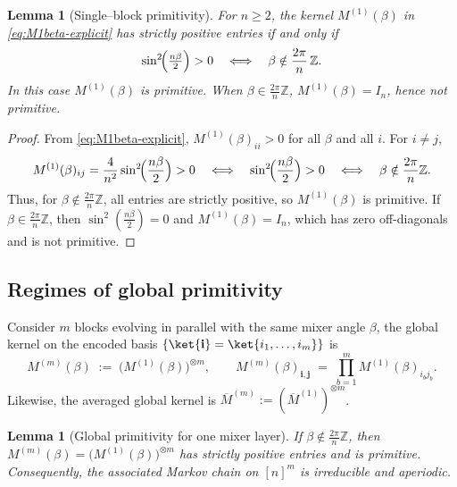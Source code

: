 \documentclass[a4paper,unpublished,onecolumn,11pt]{quantumarticle}
\newtheorem{lemma}[theorem]{Lemma}
\theoremstyle{definition}
\theoremstyle{remark}
\begin{document}
\begin{lemma}[Single--block primitivity]
\label{lem:single-block-primitivity}
For $n\ge 2$, the kernel $M^{(1)}(\beta)$ in \eqref{eq:M1beta-explicit}
has strictly positive entries if and only if
\[
  \sin^2\!\Bigl(\tfrac{n\beta}{2}\Bigr) > 0
  \quad\Longleftrightarrow\quad
  \beta \notin \frac{2\pi}{n}\,\mathbb{Z}.
\]
In this case $M^{(1)}(\beta)$ is primitive. When
$\beta \in \tfrac{2\pi}{n}\mathbb{Z}$, $M^{(1)}(\beta)=I_n$, hence not primitive.
\end{lemma}

\begin{proof}
From \eqref{eq:M1beta-explicit}, $M^{(1)}(\beta)_{ii}>0$ for all $\beta$ and all $i$.
For $i\neq j$,
\[
M^{(1)}(\beta)_{ij}=\frac{4}{n^2}\sin^2\!\Bigl(\frac{n\beta}{2}\Bigr)>0
\quad\Longleftrightarrow\quad
\sin^2\!\Bigl(\frac{n\beta}{2}\Bigr)>0
\quad\Longleftrightarrow\quad
\beta\notin\frac{2\pi}{n}\mathbb Z.
\]
Thus, for $\beta\notin\frac{2\pi}{n}\mathbb Z$, all entries are strictly positive, so
$M^{(1)}(\beta)$ is primitive. If $\beta\in\frac{2\pi}{n}\mathbb Z$, then
$\sin^2(\tfrac{n\beta}{2})=0$ and $M^{(1)}(\beta)=I_n$,
which has zero off-diagonals and is not primitive.
\end{proof}

\subsection{Regimes of global primitivity}
\label{sec:pf-primitivity}

Consider $m$ blocks evolving in parallel with the same mixer angle $\beta$, the global kernel
on the encoded basis $\{\ket{\mathbf{i}}=\ket{i_1,\dots,i_m}\}$ is
\begin{equation}
\label{eq:Mm-def}
  M^{(m)}(\beta)
  \;:=\;
  \bigl(M^{(1)}(\beta)\bigr)^{\otimes m},
  \qquad
  M^{(m)}(\beta)_{\mathbf{i},\mathbf{j}}
  \;=\;
  \prod_{b=1}^{m} M^{(1)}(\beta)_{i_b j_b}.
\end{equation}
Likewise, the averaged global kernel is $\overline M^{(m)} := (\overline M^{(1)})^{\otimes m}$.

\begin{lemma}[Global primitivity for one mixer layer]
\label{lem:global-primitivity-one-layer}
If $\beta\notin \frac{2\pi}{n}\mathbb{Z}$, then
$M^{(m)}(\beta)=\bigl(M^{(1)}(\beta)\bigr)^{\otimes m}$ has strictly
positive entries and is primitive. Consequently, the associated Markov chain
on $[n]^m$ is irreducible and aperiodic.
\end{lemma}
\end{document}
